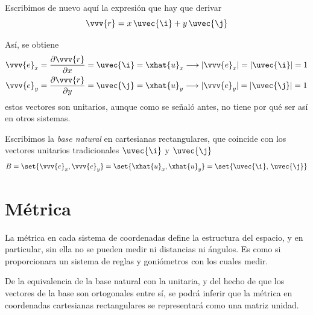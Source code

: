 Escribimos de nuevo aquí la expresión que hay que derivar
\[
  \vvv{r} = x\,\uvec{\i} + y\,\uvec{\j}
\]

Así, se obtiene
\begin{subequations}
  \begin{align}\label{eq:R2-cart-ex}
    \vvv{e}_x
    &=
      \dfrac{\partial\vvv{r}}{\partial x}
      = \uvec{\i}
      = \xhat{u}_x
      \longrightarrow
    |\vvv{e}_x| = |\uvec{\i}| = 1\\
    \label{eq:R2-cart-ey}
    \vvv{e}_y
    &= \dfrac{\partial\vvv{r}}{\partial y}
      = \uvec{\j}
      = \xhat{u}_y
      \longrightarrow
    |\vvv{e}_y| = |\uvec{\j}| = 1
  \end{align}
\end{subequations}
estos vectores son unitarios, aunque como se señaló antes, no tiene por qué ser así en
otros sistemas.

Escribimos la \emph{base natural} en cartesianas rectangulares, que coincide con los
vectores unitarios tradicionales $\uvec{\i}$ y $\uvec{\j}$
\begin{equation}\label{eq:R2-cart-base}
  B
  =\set{\vvv{e}_x, \vvv{e}_y}
  = \set{\xhat{u}_x, \xhat{u}_y}
  = \set{\uvec{\i},\, \uvec{\j}}
\end{equation}


\section{Métrica}
La métrica en cada sistema de coordenadas define la estructura del espacio, y en
particular, sin ella no se pueden medir ni distancias ni ángulos. Es como si
proporcionara un sistema de reglas y goniómetros con los cuales medir.

De la equivalencia de la base natural con la unitaria, y del hecho de que los vectores de
la base son ortogonales entre sí, se podrá inferir que la métrica en coordenadas
cartesianas rectangulares se representará como una matriz unidad.

